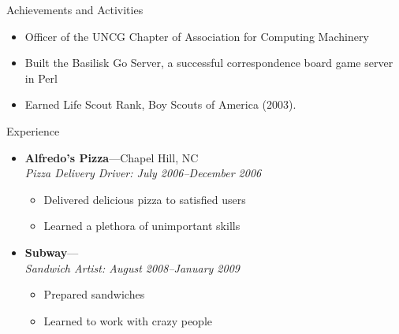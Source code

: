 \documentclass[11pt,oneside]{article}
\newenvironment{ressection}[1]{
	\vspace{4pt}
	{\fontfamily{phv}\selectfont\Large#1}
	\begin{itemize}
	\vspace{3pt}
}{
	\end{itemize}
}
\newcommand{\resitem}[1]{
	\vspace{-4pt}
	\item \begin{flushleft} #1 \end{flushleft}
}
\newcommand{\ressubitem}[1]{
	\vspace{-1pt}
	\item \begin{flushleft} #1 \end{flushleft}
}
\newcommand{\resbigitem}[3]{
	\vspace{-5pt}
	\item
	\textbf{#1}---#2 \\
	\textit{#3}
}
\newenvironment{ressubsec}[3]{
	\resbigitem{#1}{#2}{#3}
	\vspace{-2pt}
	\begin{itemize}
}{
	\end{itemize}
}
\begin{document}
\begin{ressection}{Achievements and Activities}

	\resitem{Officer of the UNCG Chapter of Association for Computing Machinery}

	\resitem{Built the Basilisk Go Server, a successful correspondence board game server in Perl}

	\resitem{Earned Life Scout Rank, Boy Scouts of America (2003).}


\end{ressection}


\begin{ressection}{Experience}

	\begin{ressubsec}{Alfredo's Pizza}{Chapel Hill, NC}{Pizza Delivery Driver: July 2006--December 2006}
		\ressubitem{Delivered delicious pizza to satisfied users}
		\ressubitem{Learned a plethora of unimportant skills}
	\end{ressubsec}

	\begin{ressubsec}{Subway}{}{Sandwich Artist: August 2008--January 2009}
		\ressubitem{Prepared sandwiches}
		\ressubitem{Learned to work with crazy people}
	\end{ressubsec}

\end{ressection}
\end{document}
